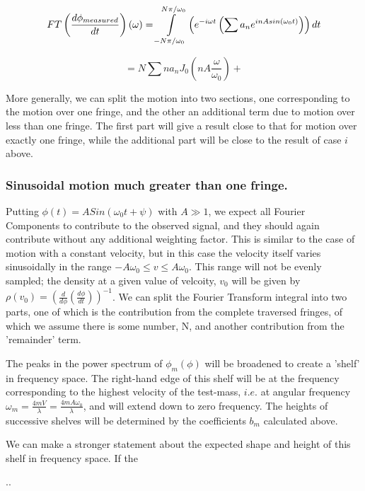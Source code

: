 \documentclass{article}
\begin{document}
\[
FT\left(\frac{d\phi_{measured}}{dt}\right)(\omega)=\intop_{-N\pi/\omega_{0}}^{N\pi/\omega_{0}}\left(e^{-i\omega t}\left(\sum a_{n}e^{inAsin\left(\omega_{0}t\right)}\right)\right)dt
\]


\[
=N\sum na_{n}J_{0}(nA\frac{\omega}{\omega_{0}})+
\]


More generally, we can split the motion into two sections, one corresponding
to the motion over one fringe, and the other an additional term due
to motion over less than one fringe. The first part will give a result
close to that for motion over exactly one fringe, while the additional
part will be close to the result of case $i$ above.


\subsubsection{Sinusoidal motion much greater than one fringe.}

Putting $\phi\left(t\right)=ASin\left(\omega_{0}t+\psi\right)$ with
$A\gg1$, we expect all Fourier Components to contribute to the observed
signal, and they should again contribute without any additional weighting
factor. This is similar to the case of motion with a constant velocity,
but in this case the velocity itself varies sinusoidally in the range
$-A\omega_{0}\leq v\leq A\omega_{0}$. This range will not be evenly
sampled; the density at a given value of velcoity, $v_{0}$ will be
given by $\rho(v_{0})=\left(\frac{d}{d\phi}\left(\frac{d\phi}{dt}\right)\right)^{-1}$.
We can split the Fourier Transform integral into two parts, one of
which is the contribution from the complete traversed fringes, of
which we assume there is some number, N, and another contribution
from the 'remainder' term.

The peaks in the power spectrum of $\phi_{m}\left(\phi\right)$ will
be broadened to create a 'shelf' in frequency space. The right-hand
edge of this shelf will be at the frequency corresponding to the highest
velocity of the test-mass, $i.e.$ at angular frequency $\omega_{m}=\frac{4mV}{\lambda}=\frac{4mA\omega_{0}}{\lambda}$,
and will extend down to zero frequency. The heights of successive
shelves will be determined by the coefficients $b_{m}$ calculated
above.

We can make a stronger statement about the expected shape and height
of this shelf in frequency space. If the 




.. \citep{adams1995hitchhiker}



\end{document}
